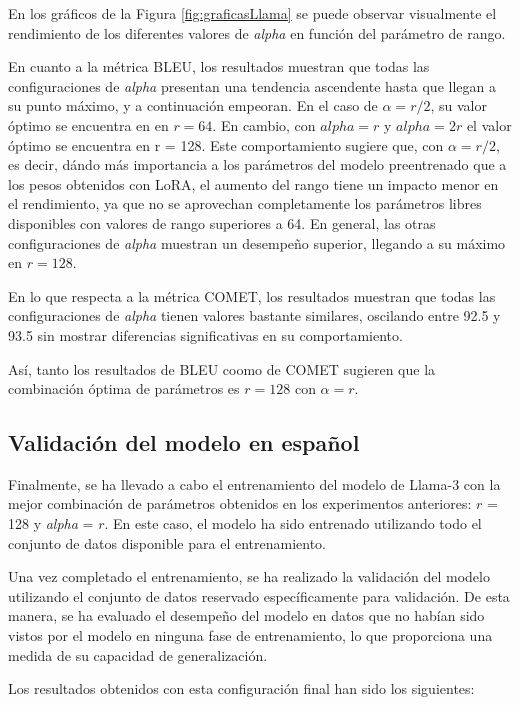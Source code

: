 \documentclass[11pt,spanish,listoffigures,listoftables]{tfgetsinf}
\begin{document}
En los gráficos de la Figura \ref{fig:graficasLlama} se puede observar visualmente el rendimiento de los diferentes valores de \textit{alpha} en función del parámetro de rango.

En cuanto a la métrica BLEU, los resultados muestran que todas las configuraciones de \textit{alpha} presentan una tendencia ascendente hasta que llegan a su punto máximo, y a continuación empeoran. En el caso de $\alpha = r/2$, su valor óptimo se encuentra en en $r = 64$. En cambio, con $alpha = r$ y $alpha = 2r$ el valor óptimo se encuentra en r = 128. Este comportamiento sugiere que, con $\alpha = r/2$, es decir, dándo más importancia a los parámetros del modelo preentrenado que a los pesos obtenidos con LoRA, el aumento del rango tiene un impacto menor en el rendimiento, ya que no se aprovechan completamente los parámetros libres disponibles con valores de rango superiores a 64. En general, las otras configuraciones de \textit{alpha} muestran un desempeño superior, llegando a su máximo en $r = 128$.

En lo que respecta a la métrica COMET, los resultados muestran que todas las configuraciones de \textit{alpha} tienen valores bastante similares, oscilando entre 92.5 y 93.5 sin mostrar diferencias significativas en su comportamiento.

Así, tanto los resultados de BLEU coomo de COMET sugieren que la combinación óptima de parámetros es $r = 128$ con $\alpha = r$.

\subsection{Validación del modelo en español}

Finalmente, se ha llevado a cabo el entrenamiento del modelo de Llama-3 con la mejor combinación de parámetros obtenidos en los experimentos anteriores: $r$ = 128 y \textit{alpha} = $r$. En este caso, el modelo ha sido entrenado utilizando todo el conjunto de datos disponible para el entrenamiento.

Una vez completado el entrenamiento, se ha realizado la validación del modelo utilizando el conjunto de datos reservado específicamente para validación. De esta manera, se ha evaluado el desempeño del modelo en datos que no habían sido vistos por el modelo en ninguna fase de entrenamiento, lo que proporciona una medida de su capacidad de generalización.

Los resultados obtenidos con esta configuración final han sido los siguientes:
\end{document}
